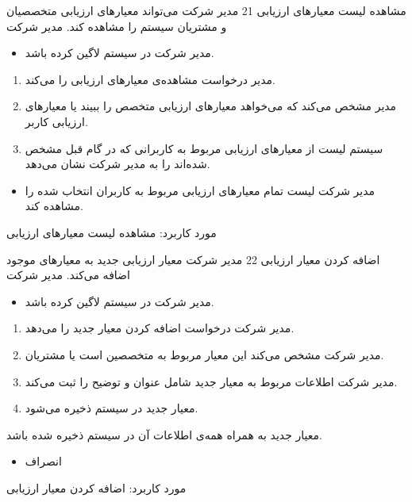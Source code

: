 {
\usecase
{
مشاهده لیست معیارهای ارزیابی
}
{
	21
}
{
مدیر شرکت می‌تواند معیارهای ارزیابی متخصصیان و مشتریان سیستم را مشاهده کند.
}
{
مدیر شرکت
}
{
}
{
	\begin{itemize}
	\vspace*{-0.6cm}
	\item 
	مدیر شرکت در سیستم لاگین کرده باشد.
\end{itemize}
}
{
	\vspace*{-0.6cm}
	\begin{enumerate}
		\item 
		مدیر درخواست مشاهده‌ی معیارهای ارزیابی را می‌کند.
		\item
	مدیر مشخص می‌کند که می‌خواهد معیارهای ارزیابی متخصص را ببیند یا معیارهای ارزیابی کاربر.
	\item 
	سیستم لیست از معیارهای ارزیابی مربوط به کاربرانی که در گام قبل مشخص شده‌اند را به مدیر شرکت نشان می‌دهد.
	\end{enumerate}
}
{
	\begin{itemize}
	\vspace*{-0.6cm}
	\item 
مدیر شرکت لیست تمام معیارهای ارزیابی مربوط به کاربران انتخاب شده را مشاهده کند.
\end{itemize}
}
{
}
{
	مورد کاربرد: مشاهده لیست معیارهای ارزیابی
}
}


{
\usecase
{
	 اضافه کردن معیار ارزیابی
}
{22}
{
مدیر شرکت معیار ارزیابی جدید به معیارهای موجود اضافه می‌کند.
}
{
مدیر شرکت
}
{
}
{
	\begin{itemize}
	\vspace*{-0.6cm}
	\item 
	مدیر شرکت در سیستم لاگین کرده باشد.
\end{itemize}	
}
{
	\vspace*{-0.6cm}
\begin{enumerate}
	\item
	مدیر شرکت درخواست اضافه کردن معیار جدید را می‌دهد.
	\item
	مدیر شرکت مشخص می‌کند این معیار مربوط به متخصصین است یا مشتریان.
	\item
		مدیر شرکت اطلاعات مربوط به معیار جدید شامل عنوان و توضیح را ثبت می‌کند.
		\item
		معیار جدید در سیستم ذخیره می‌شود.
\end{enumerate}
}
{
معیار جدید به همراه همه‌ی اطلاعات آن در سیستم ذخیره شده باشد.
}
{
	\begin{itemize}
		\vspace*{-0.6cm}
		\item 
		انصراف
	\end{itemize}
}
{
	مورد کاربرد: اضافه کردن معیار ارزیابی
}



}



